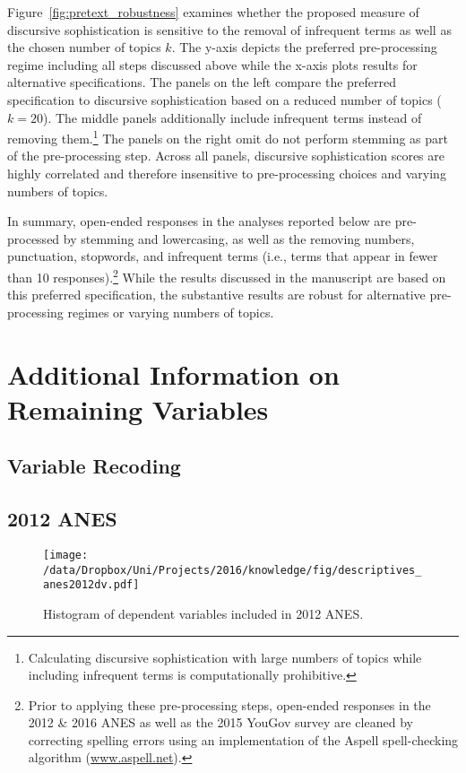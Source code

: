 Figure~\ref{fig:pretext_robustness} examines whether the proposed measure of discursive sophistication is sensitive to the removal of infrequent terms as well as the chosen number of topics $k$. The y-axis depicts the preferred pre-processing regime including all steps discussed above while the x-axis plots results for alternative specifications. The panels on the left compare the preferred specification to discursive sophistication based on a reduced number of topics ($k=20$). The middle panels additionally include infrequent terms instead of removing them.\footnote{Calculating discursive sophistication with large numbers of topics while including infrequent terms is computationally prohibitive.} The panels on the right omit do not perform stemming as part of the pre-processing step. Across all panels, discursive sophistication scores are highly correlated and therefore insensitive to pre-processing choices and varying numbers of topics.

In summary, open-ended responses in the analyses reported below are pre-processed by stemming and lowercasing, as well as the removing numbers, punctuation, stopwords, and infrequent terms (i.e., terms that appear in fewer than 10 responses).\footnote{Prior to applying these pre-processing steps, open-ended responses in the 2012 \& 2016 ANES as well as the 2015 YouGov survey are cleaned by correcting spelling errors using an implementation of the Aspell spell-checking algorithm (\url{www.aspell.net}).} While the results discussed in the manuscript are based on this preferred specification, the substantive results are robust for alternative pre-processing regimes or varying numbers of topics.


\clearpage
\section{Additional Information on Remaining Variables}
\renewcommand\thefigure{C.\arabic{figure}}
\renewcommand\thetable{C.\arabic{table}}
\setcounter{figure}{0}
\setcounter{table}{0}

\subsection{Variable Recoding}


\clearpage
\subsection{2012 ANES}
\begin{figure}[h]\centering
\texttt{[image: /data/Dropbox/Uni/Projects/2016/knowledge/fig/descriptives\_anes2012dv.pdf]}
\caption{Histogram of dependent variables included in 2012 ANES.}\label{fig:descriptives_anes2012dv}
\end{figure}

